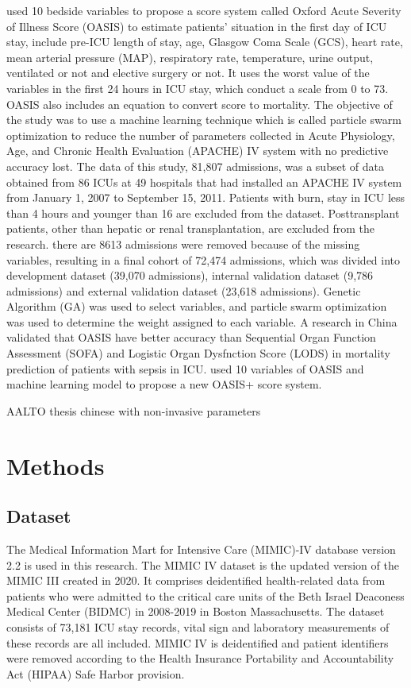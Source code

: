 \documentclass[12pt,a4paper,english
]{tunithesis}
\begin{document}
\textcite{johnson2013} used 10 bedside variables to propose a score system called Oxford Acute Severity of Illness Score (OASIS) to estimate patients' situation in the first day of ICU stay, include pre-ICU length of stay, age, Glasgow Coma Scale (GCS), heart rate, mean arterial pressure (MAP), respiratory rate, temperature, urine output, ventilated or not and elective surgery or not. It uses the worst value of the variables in the first 24 hours in ICU stay, which conduct a scale from 0 to 73. OASIS also includes an equation to convert score to mortality. The objective of the study was to use a machine learning technique which is called particle swarm optimization to reduce the number of parameters collected in Acute Physiology, Age, and Chronic Health Evaluation (APACHE) IV system with no predictive accuracy lost. The data of this study, 81,807 admissions, was a subset of data obtained from 86 ICUs at 49 hospitals that had installed an APACHE IV system from January 1, 2007 to September 15, 2011. Patients with burn, stay in ICU less than 4 hours and younger than 16 are excluded from the dataset. Posttransplant patients, other than hepatic or renal transplantation, are excluded from the research. there are 8613 admissions were removed because of the missing variables, resulting in a final cohort of 72,474 admissions, which was divided into development dataset (39,070 admissions), internal validation dataset (9,786 admissions) and external validation dataset (23,618 admissions). Genetic Algorithm (GA) was used to select variables, and particle swarm optimization was used to determine the weight assigned to each variable. A research in China validated that OASIS have better accuracy than Sequential Organ Function Assessment (SOFA) and Logistic Organ Dysfnction Score (LODS) in mortality prediction of patients with sepsis in ICU. \parencite{hu2020} \textcite{el-manzalawy2021} used 10 variables of OASIS and machine learning model to propose a new OASIS+ score system.


AALTO thesis
chinese with non-invasive parameters

\chapter{Methods}
\label{ch:methods}

\section{Dataset}
The Medical Information Mart for Intensive Care (MIMIC)-IV database version 2.2 is used in this research. \parencite{johnson2023} The MIMIC IV dataset is the updated version of the MIMIC III created in 2020. It comprises deidentified health-related data from patients who were admitted to the critical care units of the Beth Israel Deaconess Medical Center (BIDMC) in 2008-2019 in Boston Massachusetts. The dataset consists of 73,181 ICU stay records, vital sign and laboratory measurements of these records are all included. MIMIC IV is deidentified and patient identifiers were removed according to the Health Insurance Portability and Accountability Act (HIPAA) Safe Harbor provision.
\end{document}
